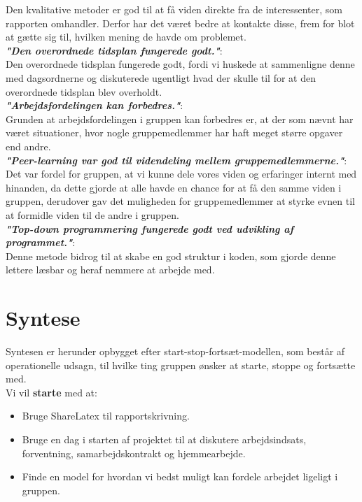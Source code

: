 \documentclass[oneside,a4paper,titlepage]{article}
\begin{document}
Den kvalitative metoder er god til at få viden direkte fra de interessenter, som rapporten omhandler. Derfor har det været bedre at kontakte disse, frem for blot at gætte sig til, hvilken mening de havde om problemet. \\

\textbf{\textit{"Den overordnede tidsplan fungerede godt."}}: \\

Den overordnede tidsplan fungerede godt, fordi vi huskede at sammenligne denne med dagsordnerne og diskuterede ugentligt hvad der skulle til for at den overordnede tidsplan blev overholdt.  \\

\textbf{\textit{"Arbejdsfordelingen kan forbedres."}}: \\

Grunden at arbejdsfordelingen i gruppen kan forbedres er, at der som nævnt har været situationer, hvor nogle gruppemedlemmer har haft meget større opgaver end andre.  \\

\textbf{\textit{"Peer-learning var god til videndeling mellem gruppemedlemmerne."}}: \\

Det var fordel for gruppen, at vi kunne dele vores viden og erfaringer internt med hinanden, da dette gjorde at alle havde en chance for at få den samme viden i gruppen, derudover gav det muligheden for gruppemedlemmer at styrke evnen til at formidle viden til de andre i gruppen. \\

\textbf{\textit{"Top-down programmering fungerede godt ved udvikling af programmet."}}: \\

Denne metode bidrog til at skabe en god struktur i koden, som gjorde denne lettere læsbar og heraf nemmere at arbejde med.


\section{Syntese}
Syntesen er herunder opbygget efter start-stop-fortsæt-modellen, som består af operationelle udsagn, til hvilke ting gruppen ønsker at starte, stoppe og fortsætte med.\\

Vi vil \textbf{starte} med at:
\begin{itemize}
  \item Bruge ShareLatex til rapportskrivning. 
  \item Bruge en dag i starten af projektet til at diskutere arbejdsindsats, forventning, samarbejdskontrakt og hjemmearbejde. 
  \item Finde en model for hvordan vi bedst muligt kan fordele arbejdet ligeligt i gruppen.  
\end{itemize}
\end{document}
